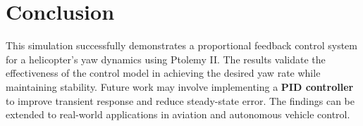 \documentclass{article}
\begin{document}
\section{Conclusion}
This simulation successfully demonstrates a proportional feedback control system for a helicopter's yaw dynamics using Ptolemy II. The results validate the effectiveness of the control model in achieving the desired yaw rate while maintaining stability. Future work may involve implementing a \textbf{PID controller} to improve transient response and reduce steady-state error. The findings can be extended to real-world applications in aviation and autonomous vehicle control.
\end{document}

